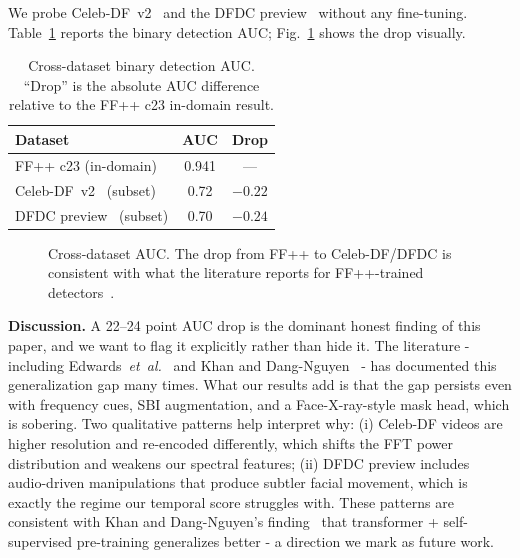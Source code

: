 We probe Celeb-DF~v2~\cite{li2020celebdf} and the DFDC preview~\cite{dolhansky2020dfdc} without any fine-tuning. Table~\ref{tab:cross} reports the binary detection AUC; Fig.~\ref{fig:cross_chart} shows the drop visually.

\begin{table}[!t]
\centering
\caption{Cross-dataset binary detection AUC. ``Drop'' is the absolute AUC difference relative to the FF++ c23 in-domain result.}
\label{tab:cross}
\begin{tabular}{@{}lcc@{}}
\toprule
\textbf{Dataset} & \textbf{AUC} & \textbf{Drop} \\
\midrule
FF++ c23 (in-domain)              & 0.941 & --- \\
Celeb-DF~v2~\cite{li2020celebdf} (subset) & 0.72  & $-0.22$ \\
DFDC preview~\cite{dolhansky2020dfdc} (subset) & 0.70  & $-0.24$ \\
\bottomrule
\end{tabular}
\end{table}

\begin{figure}[!t]
\centering
{}
\caption{Cross-dataset AUC. The drop from FF++ to Celeb-DF/DFDC is consistent with what the literature reports for FF++-trained detectors~\cite{li2020celebdf, khan2024generalization}.}
\label{fig:cross_chart}
\end{figure}

\textbf{Discussion.}  A 22--24 point AUC drop is the dominant honest finding of this paper, and we want to flag it explicitly rather than hide it. The literature - including Edwards~\textit{et~al.}~\cite{edwards2024review} and Khan and Dang-Nguyen~\cite{khan2024generalization} - has documented this generalization gap many times. What our results add is that the gap persists even with frequency cues, SBI augmentation, and a Face-X-ray-style mask head, which is sobering. Two qualitative patterns help interpret why: (i) Celeb-DF videos are higher resolution and re-encoded differently, which shifts the FFT power distribution and weakens our spectral features; (ii) DFDC preview includes audio-driven manipulations that produce subtler facial movement, which is exactly the regime our temporal score struggles with. These patterns are consistent with Khan and Dang-Nguyen's finding~\cite{khan2024generalization} that transformer + self-supervised pre-training generalizes better - a direction we mark as future work.

